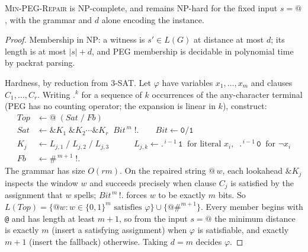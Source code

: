 \documentclass[manuscript]{acmart}
\newcommand{\cd}[1]{\texttt{#1}}
\begin{document}
\begin{theorem}
\label{thm:hardness}
\textsc{Min-PEG-Repair} is NP-complete, and remains NP-hard for the fixed input $s = \cd{@}$, with the grammar and $d$ alone encoding the instance.
\end{theorem}

\begin{proof}
Membership in NP: a witness is $s' \in L(G)$ at distance at most $d$; its length is at most $|s| + d$, and PEG membership is decidable in polynomial time by packrat parsing.

Hardness, by reduction from 3-SAT. Let $\varphi$ have variables $x_1, \ldots, x_m$ and clauses $C_1, \ldots, C_r$. Writing $\cd{.}^{k}$ for a sequence of $k$ occurrences of the any-character terminal (PEG has no counting operator; the expansion is linear in $k$), construct:
\begin{align*}
\mathit{Top} &\leftarrow \cd{@} \; (\mathit{Sat} \; / \; \mathit{Fb})\\
\mathit{Sat} &\leftarrow \mathop{\&}\mathit{K}_1 \; \mathop{\&}\mathit{K}_2 \cdots \mathop{\&}\mathit{K}_r \;\; \mathit{Bit}^{\,m} \; \mathop{!}\cd{.}
\qquad \mathit{Bit} \leftarrow \cd{0} / \cd{1}\\
\mathit{K}_j &\leftarrow L_{j,1} \; / \; L_{j,2} \; / \; L_{j,3}
\qquad\quad L_{j,k} \leftarrow \cd{.}^{\,i-1}\,\cd{1} \;\;\text{for literal } x_i,\;\; \cd{.}^{\,i-1}\,\cd{0} \;\;\text{for } \lnot x_i\\
\mathit{Fb} &\leftarrow \cd{\#}^{\,m+1} \; \mathop{!}\cd{.}
\end{align*}
The grammar has size $O(rm)$. On the repaired string $\cd{@}\,w$, each lookahead $\mathop{\&}\mathit{K}_j$ inspects the window $w$ and succeeds precisely when clause $C_j$ is satisfied by the assignment that $w$ spells; $\mathit{Bit}^{\,m}\,\mathop{!}\cd{.}$ forces $w$ to be exactly $m$ bits. So $L(\mathit{Top}) = \{\cd{@}w : w \in \{0,1\}^m \text{ satisfies } \varphi\} \cup \{\cd{@}\cd{\#}^{m+1}\}$. Every member begins with \cd{@} and has length at least $m + 1$, so from the input $s = \cd{@}$ the minimum distance is exactly $m$ (insert a satisfying assignment) when $\varphi$ is satisfiable, and exactly $m + 1$ (insert the fallback) otherwise. Taking $d = m$ decides $\varphi$.
\end{proof}
\end{document}
